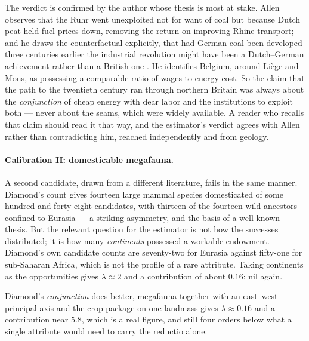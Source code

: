 \documentclass[11pt]{article}
\numberwithin{equation}{section}
\theoremstyle{plain}
\theoremstyle{definition}
\theoremstyle{remark}
\begin{document}
The verdict is confirmed by the author whose thesis is most at stake.
Allen observes that the Ruhr went unexploited not for want of coal but
because Dutch peat held fuel prices down, removing the return on
improving Rhine transport; and he draws the counterfactual explicitly,
that had German coal been developed three centuries earlier the
industrial revolution might have been a Dutch--German achievement rather
than a British one \cite{Allen09}. He identifies Belgium, around
Li\`ege and Mons, as possessing a comparable ratio of wages to energy
cost. So the claim that the path to the twentieth century ran through
northern Britain was always about the \emph{conjunction} of cheap energy
with dear labor and the institutions to exploit both --- never about
the seams, which were widely available. A reader who recalls that claim
should read it that way, and the estimator's verdict agrees with Allen
rather than contradicting him, reached independently and from geology.

\paragraph{Calibration II: domesticable megafauna.} A second candidate,
drawn from a different literature, fails in the same manner. Diamond's
count gives fourteen large mammal species domesticated of some hundred
and forty-eight candidates, with thirteen of the fourteen wild ancestors
confined to Eurasia \cite{Diamond97} --- a striking asymmetry, and the
basis of a well-known thesis. But the relevant question for the
estimator is not how the successes distributed; it is how many
\emph{continents} possessed a workable endowment. Diamond's own
candidate counts are seventy-two for Eurasia against fifty-one for
sub-Saharan Africa, which is not the profile of a rare attribute. Taking
continents as the opportunities gives $\lambda\approx2$ and a
contribution of about $0.16$: nil again.

Diamond's \emph{conjunction} does better, megafauna together with an
east--west principal axis and the crop package on one landmass gives
$\lambda\approx0.16$ and a contribution near $5.8$, which is a real
figure, and still four orders below what a single attribute would need
to carry the reductio alone.
\end{document}
